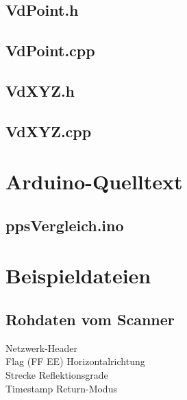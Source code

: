 \documentclass[a4paper,12pt,bibliography=totoc, listof=totoc,titlepage,pointlessnumbers]{scrreprt}
\begin{document}
\begin{appendices}
\section{VdPoint.h}
\label{a:VdPoint.h}


\section{VdPoint.cpp}
\label{a:VdPoint.cpp}


\section{VdXYZ.h}
\label{a:VdXYZ.h}


\section{VdXYZ.cpp}
\label{a:VdXYZ.cpp}


\chapter{Arduino-Quelltext}
\section{ppsVergleich.ino}
\label{a:ppsVergleich.ino}


\chapter{Beispieldateien}

\section{Rohdaten vom Scanner}
\label{a:Rohdaten}

{\color{gray} Netzwerk-Header}\\
{\color{red} Flag (FF EE)} {\color{green} Horizontalrichtung}\\
{\color{blue} Strecke} {\color{orange} Reflektionsgrade\\
{\color{yellow} Timestamp } {\color{violet} Return-Modus}\\
\\

}
\end{appendices}
\end{document}
